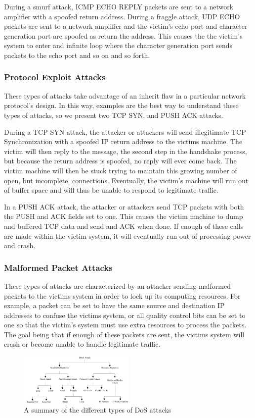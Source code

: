 \documentclass{acm_proc_article-sp}
\begin{document}
    		During a smurf attack, ICMP ECHO REPLY packets are sent to a network amplifier with a spoofed return address. During a fraggle attack, UDP ECHO packets are sent to a network amplifier and the victim's echo port and character generation port are spoofed as return the address. This causes the the victim's system to enter and infinite loop where the character generation port sends packets to the echo port and so on and so forth.
    		\subsubsection{Protocol Exploit Attacks}
    		These types of attacks take advantage of an inherit flaw in a particular network protocol's design. In this way, examples are the best way to understand these types of attacks, so we present two TCP SYN, and PUSH ACK attacks. 
    		
    		During a TCP SYN attack, the attacker or attackers will send illegitimate TCP Synchronization with a spoofed IP return address to the victims machine. The victim will then  reply to the message, the second step in the handshake process, but because the return address is spoofed, no reply will ever come back. The victim machine will then be stuck trying to maintain this growing number of open, but incomplete, connections. Eventually, the victim's machine will run out of buffer space and will thus be unable to respond to legitimate traffic.
    		
    		In a PUSH ACK attack, the attacker or attackers send TCP packets with both the PUSH and ACK fields set to one. This causes the victim machine to dump and buffered TCP data and send and ACK when done. If enough of these calls are made within the victim system, it will eventually run out of processing power and crash.
    		\subsubsection{Malformed Packet Attacks}
    		These types of attacks are characterized by an attacker sending malformed packets to the victims system in order to lock up its computing resources. For example, a packet can be set to have the same source and destination IP addresses to confuse the victims system, or all quality control bits can be set to one so that the victim's system must use extra resources to process the packets. The goal being that if enough of these packets are sent, the victims system will crash or become unable to handle legitimate traffic.
    		\begin{figure}[h!]
				\centering
				\includegraphics[width=0.5\textwidth]{doSBreakdown.png}
				\caption{A summary of the different types of DoS attacks \cite{Specht2004}}
				\label{breakdown2}
 			\end{figure}
\end{document}
